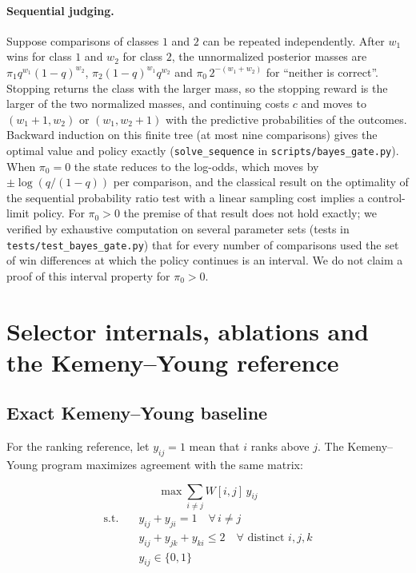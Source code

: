 \paragraph{Sequential judging.}
Suppose comparisons of classes $1$ and $2$ can be repeated independently. After $w_1$ wins for class $1$ and $w_2$ for class
$2$, the unnormalized posterior masses are $\pi_1q^{w_1}(1-q)^{w_2}$, $\pi_2(1-q)^{w_1}q^{w_2}$ and $\pi_0\,2^{-(w_1+w_2)}$ for
``neither is correct''. Stopping returns the class with the larger mass, so the stopping reward is the larger of the two
normalized masses, and continuing costs $c$ and moves to $(w_1+1,w_2)$ or $(w_1,w_2+1)$ with the predictive probabilities of the
outcomes. Backward induction on this finite tree (at most nine comparisons) gives the optimal value and policy
exactly (\texttt{solve\_sequence} in \texttt{scripts/bayes\_gate.py}). When $\pi_0=0$ the state reduces to the
log-odds, which moves by $\pm\log(q/(1-q))$ per comparison, and the classical result on the optimality of the sequential
probability ratio test with a linear sampling cost \citep{wald1948optimum,arrow1949bayes} implies a control-limit policy. For
$\pi_0>0$ the premise of that result does not hold exactly; we verified by exhaustive computation on several parameter sets
(tests in \texttt{tests/test\_bayes\_gate.py}) that for every number of comparisons used the set of win differences at which
the policy continues is an interval. We do not claim a proof of this interval property for $\pi_0>0$.

\section{Selector internals, ablations and the Kemeny--Young reference}
\label{sec:selector-internals}

\subsection{Exact Kemeny--Young baseline}
\label{sec:kemeny-exact}

For the ranking reference, let $y_{ij}=1$ mean that $i$ ranks above $j$.
The Kemeny--Young program maximizes agreement with the same matrix:

\begin{equation}
\max \sum_{i \neq j} W[i,j]\, y_{ij}
\label{eq:kemeny-obj}
\end{equation}
\begin{align}
\text{s.t.} \quad & y_{ij} + y_{ji} = 1 \quad \forall\, i \neq j \label{eq:kemeny-antisym}\\
& y_{ij} + y_{jk} + y_{ki} \leq 2 \quad \forall \text{ distinct } i,j,k \label{eq:kemeny-transitivity}\\
& y_{ij} \in \{0,1\}
\end{align}

